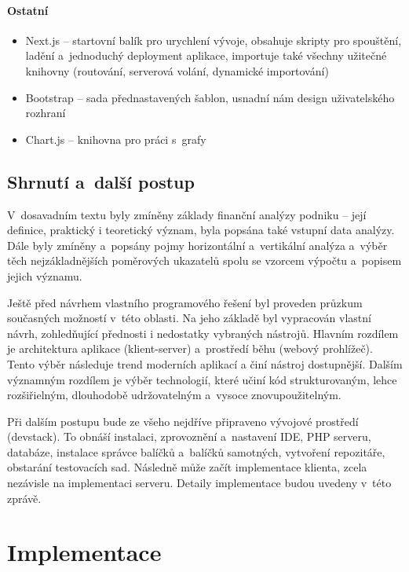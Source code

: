 \subsubsection{Ostatní}
\begin{itemize}
	\item Next.js -- startovní balík pro urychlení vývoje, obsahuje skripty pro spouštění, ladění a~jednoduchý deployment aplikace, importuje také všechny užitečné knihovny (routování, serverová volání, dynamické importování)
	\item Bootstrap -- sada přednastavených šablon, usnadní nám design uživatelského rozhraní
	\item Chart.js -- knihovna pro práci s~grafy
\end{itemize} 






\section{Shrnutí a~další postup}
V~dosavadním textu byly zmíněny základy finanční analýzy podniku -- její definice, praktický i teoretický význam, byla popsána také vstupní data analýzy. Dále byly zmíněny a~popsány pojmy horizontální a~vertikální analýza a~výběr těch nejzákladnějších poměrových ukazatelů spolu se vzorcem výpočtu a~popisem jejich významu. 

Ještě před návrhem vlastního programového řešení byl proveden průzkum současných možností v~této oblasti. Na jeho základě byl vypracován vlastní návrh, zohledňující přednosti i nedostatky vybraných nástrojů. Hlavním rozdílem je architektura aplikace (klient-server) a~prostředí běhu (webový prohlížeč). Tento výběr následuje trend moderních aplikací a činí nástroj dostupnější. Dalším významným rozdílem je výběr technologií, které učiní kód strukturovaným, lehce rozšiřielným, dlouhodobě udržovatelným a~vysoce znovupoužitelným. 

Při dalším postupu bude ze všeho nejdříve připraveno vývojové prostředí (devstack). To obnáší instalaci, zprovoznění a~nastavení IDE, PHP serveru, databáze, instalace správce balíčků a~balíčků samotných, vytvoření repozitáře, obstarání testovacích sad. Následně může začít implementace klienta, zcela nezávisle na implementaci serveru. Detaily implementace budou uvedeny v~této zprávě.



\chapter{Implementace}

